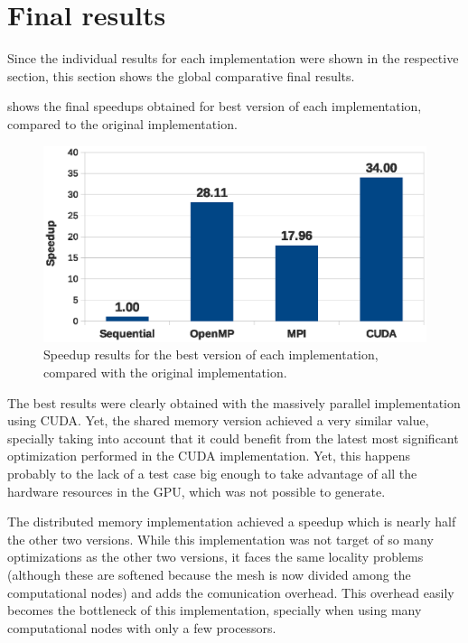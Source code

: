 \section{Final results}

Since the individual results for each implementation were shown in the respective section, this section shows the global comparative final results.

 shows the final speedups obtained for best version of each implementation, compared to the original implementation.

\begin{figure}[!htp]
	\centering
	\includegraphics[width=\columnwidth]{images/graph_comparison_all.eps}
	\caption{Speedup results for the best version of each implementation, compared with the original implementation.}
	\label{fig:results:final}
\end{figure}

The best results were clearly obtained with the massively parallel implementation using CUDA. Yet, the shared memory version achieved a very similar value, specially taking into account that it could benefit from the latest most significant optimization performed in the CUDA implementation.
Yet, this happens probably to the lack of a test case big enough to take advantage of all the hardware resources in the GPU, which was not possible to generate.

The distributed memory implementation achieved a speedup which is nearly half the other two versions.
While this implementation was not target of so many optimizations as the other two versions, it faces the same locality problems (although these are softened because the mesh is now divided among the computational nodes) and adds the comunication overhead.
This overhead easily becomes the bottleneck of this implementation, specially when using many computational nodes with only a few processors.
